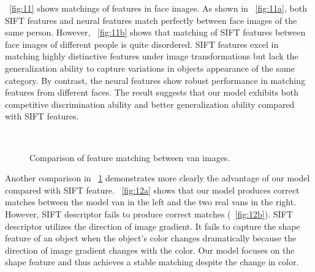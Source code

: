 \documentclass[twocolumn]{article}
\begin{document}
\figurename~\ref{fig:11} shows matchings of features in face images.
As shown in \figurename~\ref{fig:11a}, both SIFT features and neural features match perfectly between face images of the same person.
However, \figurename~\ref{fig:11b} shows that matching of SIFT features between face images of different people is quite disordered.
SIFT features excel in matching highly distinctive features under image transformations
but lack the generalization ability to capture variations in objects appearance of the same category.
By contrast, the neural features show robust performance in matching features from different faces.
The result suggests that our model exhibits both competitive discrimination ability and better generalization ability compared with SIFT features.

\begin{figure}[!t]
\centering
  \\
\caption{Comparison of feature matching between van images.}
\label{fig:12}
\end{figure}

Another comparison in \figurename~\ref{fig:12} demonstrates
more clearly the advantage of our model compared with SIFT feature.
\figurename~\ref{fig:12a} shows that our model produces correct matches
between the model van in the left and the two real vans in the right. 
However, SIFT descriptor fails to produce correct matches (\figurename~\ref{fig:12b}). 
SIFT descriptor utilizes the direction of image gradient. 
It fails to capture the shape feature of an object when the object's color changes dramatically because the direction of image gradient changes with the color. 
Our model focuses on the shape feature and thus achieves a stable matching despite the change in color.
\end{document}
